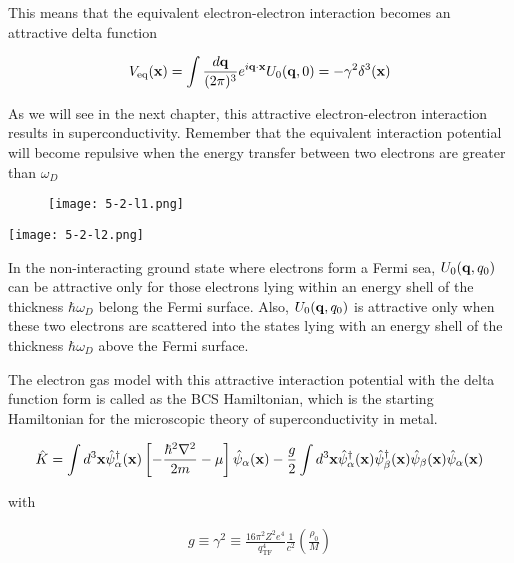 This means that the equivalent electron-electron interaction becomes an attractive delta function

\[V_{\text{eq}}({\bf x}) = \int\frac{d\bf q}{(2\pi)^3}e^{i\bf q\cdot x}U_0({\bf q},0) = -\gamma^2\delta^3(\bf x) \]

As we will see in the next chapter, this attractive electron-electron interaction results in superconductivity. Remember that the equivalent interaction potential will become repulsive when the energy transfer between two electrons are greater than $\omega_D$

\begin{wrapfigure}{r}{5.5cm}
\texttt{[image: 5-2-l1.png]}
\end{wrapfigure}
\texttt{[image: 5-2-l2.png]}

In the non-interacting ground state where electrons form a Fermi sea, $U_0({\bf q},q_0)$ can be attractive only for those electrons lying within an energy shell of the thickness $\hbar\omega_D$ belong the Fermi surface. Also, $U_0({\bf q},q_0)$ is attractive only when these two electrons are scattered into the states lying with an energy shell of the thickness $\hbar\omega_D$ above the Fermi surface.

The electron gas model with this attractive interaction potential with the delta function form is called as the BCS Hamiltonian, which is the starting Hamiltonian for the microscopic theory of superconductivity in metal.

\[\hat{K} = \int d^3{\bf x}\hat{\psi}^\dagger_\alpha({\bf x})\left[-\frac{\hbar^2\nabla^2}{2m}-\mu\right]\hat{\psi}_\alpha({\bf x}) - \frac{g}{2}\int d^3{\bf x} \hat{\psi}^\dagger_\alpha({\bf x})\hat{\psi}^\dagger_\beta({\bf x})\hat{\psi}_\beta({\bf x})\hat{\psi}_\alpha({\bf x})\]

with

\begin{align}\tag{C}
g\equiv\gamma^2\equiv\frac{16\pi^2 Z^2 e^4}{q_{\text{TF}}^4}\frac{1}{c^2}\left(\frac{\rho_0}{M}\right) \end{align}
